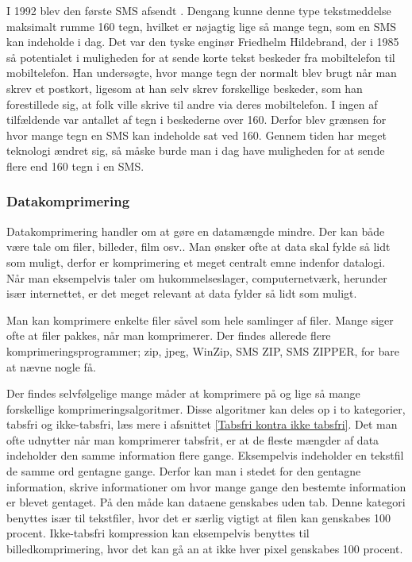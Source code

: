 I 1992 blev den første SMS afsendt \cite{museum}. Dengang kunne denne type tekstmeddelse maksimalt rumme 160 tegn, hvilket er nøjagtig lige så mange tegn, som en SMS kan indeholde i dag. Det var den tyske enginør Friedhelm Hildebrand, der i 1985 så potentialet i muligheden for at sende korte tekst beskeder fra mobiltelefon til mobiltelefon. Han undersøgte, hvor mange tegn der normalt blev brugt når man skrev et postkort, ligesom at han selv skrev forskellige beskeder, som han forestillede sig, at folk ville skrive til andre via deres mobiltelefon. I ingen af tilfældende var antallet af tegn i beskederne over 160. Derfor blev grænsen for hvor mange tegn en SMS kan indeholde sat ved 160.
Gennem tiden har meget teknologi ændret sig, så måske burde man i dag have muligheden for at sende flere end 160 tegn i en SMS. \cite{hillebrand}

\subsubsection {Datakomprimering}

Datakomprimering handler om at gøre en datamængde mindre. Der kan både være tale om filer, billeder, film osv.. Man ønsker ofte at data skal fylde så lidt som muligt, derfor er komprimering et meget centralt emne indenfor datalogi. Når man eksempelvis taler om hukommelseslager, computernetværk, herunder især internettet, er det meget relevant at data fylder så lidt som muligt.
 
Man kan komprimere enkelte filer såvel som hele samlinger af filer. Mange siger ofte at filer pakkes, når man komprimerer. Der findes allerede flere komprimeringsprogrammer; zip, jpeg, WinZip, SMS ZIP, SMS ZIPPER, for bare at nævne nogle få.

Der findes selvfølgelige mange måder at komprimere på og lige så mange forskellige komprimeringsalgoritmer. Disse algoritmer kan deles op i to kategorier, tabsfri og ikke-tabsfri, læs mere i afsnittet \ref{Tabsfri kontra ikke tabsfri}.
Det man ofte udnytter når man komprimerer tabsfrit, er at de fleste mængder af data indeholder den samme information flere gange. Eksempelvis indeholder en tekstfil de samme ord gentagne gange. Derfor kan man i stedet for den gentagne information, skrive informationer om hvor mange gange den bestemte information er blevet gentaget. På den måde kan dataene genskabes uden tab. Denne kategori benyttes især til tekstfiler, hvor det er særlig vigtigt at filen kan genskabes 100 procent. Ikke-tabsfri kompression kan eksempelvis benyttes til billedkomprimering, hvor det kan gå an at ikke hver pixel genskabes 100 procent.
